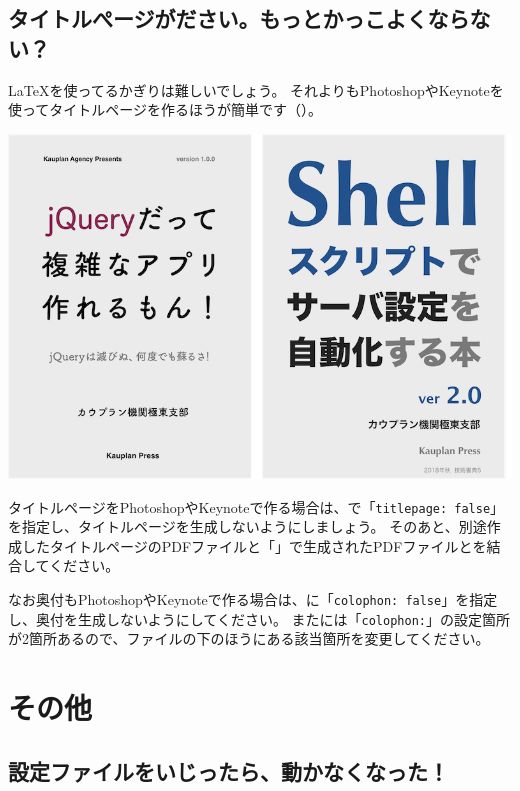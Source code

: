 \subsection{タイトルぺージがださい。もっとかっこよくならない？}
\label{sec:2-6-2}

\LaTeX{}を使ってるかぎりは難しいでしょう。
それよりもPhotoshopやKeynoteを使ってタイトルページを作るほうが簡単です（）。

\begin{reviewimage}%
\includegraphics[width=\maxwidth]{./images/chap02-faq/titlepage-samples.png}
\label{image:chap02-faq:titlepage-samples}
\end{reviewimage}

タイトルページをPhotoshopやKeynoteで作る場合は、で「\texttt{titlepage: false}」を指定し、タイトルページを生成しないようにしましょう。
そのあと、別途作成したタイトルページのPDFファイルと「」で生成されたPDFファイルとを結合してください。

なお奥付もPhotoshopやKeynoteで作る場合は、に「\texttt{colophon: false}」を指定し、奥付を生成しないようにしてください。
またには「\texttt{colophon:}」の設定箇所が2箇所あるので、ファイルの下のほうにある該当箇所を変更してください。

\section{その他}
\label{sec:2-7}

\subsection{設定ファイルをいじったら、動かなくなった！}
\label{sec:2-7-1}


